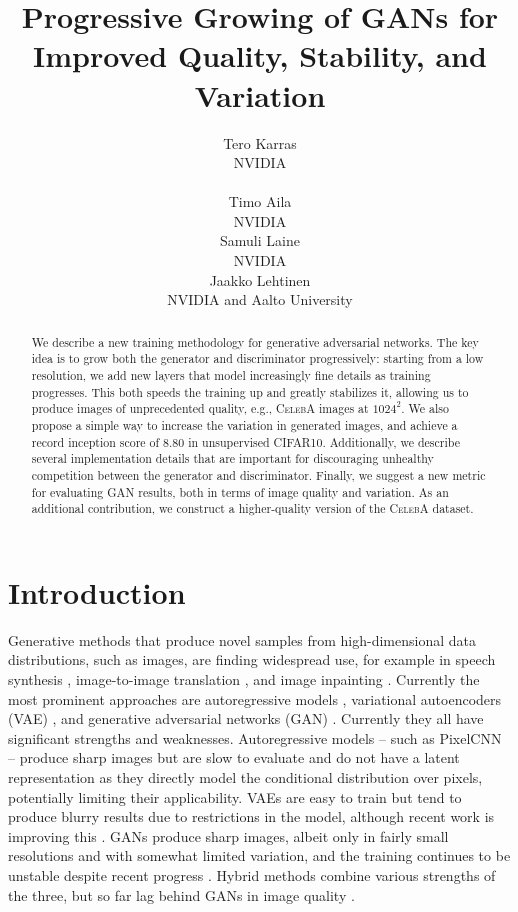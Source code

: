 \documentclass{article}
\title{Progressive Growing of GANs for Improved Quality, Stability, and Variation}
\author{%
Tero Karras\\NVIDIA\\\makebox[0pt]{\footnotesize\texttt{\hspace*{8cm}{\{tkarras,taila,slaine,jlehtinen\}@nvidia.com}}}\\\And%
Timo Aila\\NVIDIA\\\And%
Samuli Laine\\NVIDIA\\\And%
Jaakko Lehtinen\\NVIDIA and Aalto University
}
\begin{document}
{\flushleft\maketitle}
\ifx\headrulewidth\undefined\else\thispagestyle{fancy}\fi

\begin{abstract} 

We describe a new training methodology for generative adversarial networks. The key idea is to grow both the generator and discriminator progressively: starting from a low resolution, we add new layers that model increasingly fine details as training progresses. This both speeds the training up and greatly stabilizes it, allowing us to produce images of unprecedented quality, e.g., \textsc{CelebA} images at $1024^2$. We also propose a simple way to increase the variation in generated images, and achieve a record inception score of $8.80$ in unsupervised \textsc{CIFAR10}. Additionally, we describe several implementation details that are important for discouraging unhealthy competition between the generator and discriminator. Finally, we suggest a new metric for evaluating GAN results, both in terms of image quality and variation. As an additional contribution, we construct a higher-quality version of the \textsc{CelebA} dataset.

\end{abstract}

\section{Introduction}
\label{sec:intro}

Generative methods that produce novel samples from high-dimensional data distributions, such as images, are finding widespread use, for example in speech synthesis \citep{VanDenOord2016C}, image-to-image translation \citep{Zhu2017,Liu2017B,Wang2017}, and image inpainting \citep{Iizuka2017}. Currently the most prominent approaches are autoregressive models \citep{VanDenOord2016A,VanDenOord2016B}, variational autoencoders (VAE) \citep{Kingma2014}, and generative adversarial networks (GAN) \citep{Goodfellow2014}. Currently they all have significant strengths and weaknesses. Autoregressive models -- such as PixelCNN -- produce sharp images but are slow to evaluate and do not have a latent representation as they directly model the conditional distribution over pixels, potentially limiting their applicability. VAEs are easy to train but tend to produce blurry results due to restrictions in the model, although recent work is improving this \citep{Kingma2016}. GANs produce sharp images, albeit only in fairly small resolutions and with somewhat limited variation, and the training continues to be unstable despite recent progress \citep{Salimans2016B, Gulrajani2017, Berthelot2017,Kodali2017}. Hybrid methods combine various strengths of the three, but so far lag behind GANs in image quality \citep{Makhzani2017,Ulyanov2017,Dumoulin2016}.
\end{document}
